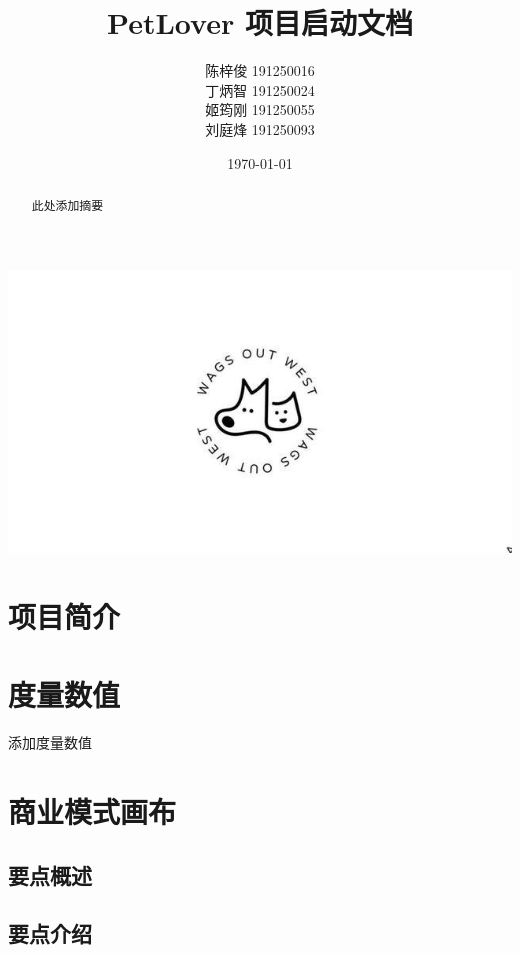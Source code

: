 \documentclass[a4paper]{ctexart}
\title{\Huge PetLover 项目启动文档}
\author{
  陈梓俊 191250016\\
  丁炳智 191250024\\
  姬筠刚 191250055\\
  刘庭烽 191250093\\
}
\date{\today}
\begin{document}
\maketitle

\centerline{\includegraphics[]{logo.jpg}}

\newpage

\begin{abstract}
  此处添加摘要
\end{abstract}



\tableofcontents

\newpage

\setlength{\parskip}{1em}


\section{项目简介}



\section{度量数值}

添加度量数值

\section{商业模式画布}

\subsection{要点概述}

\subsection{要点介绍}
\end{document}
